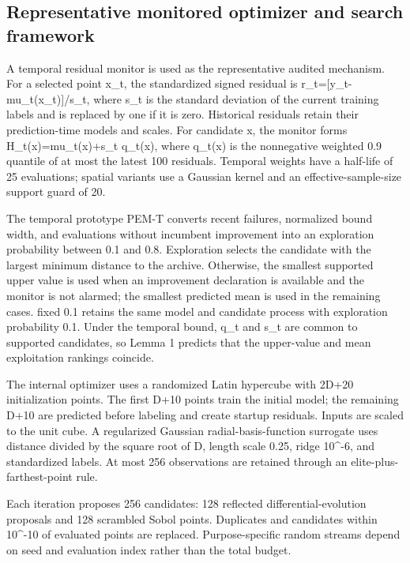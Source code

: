 \documentclass[]{interact}
\begin{document}
\hypertarget{representative-monitored-optimizer-and-search-framework}{%
\subsection{Representative monitored optimizer and search framework}\label{representative-monitored-optimizer-and-search-framework}}

A temporal residual monitor is used as the representative audited mechanism. For a selected point x\_\allowbreak t, the standardized signed residual is r\_\allowbreak t={[}y\_\allowbreak t-mu\_\allowbreak t(x\_\allowbreak t){]}/s\_\allowbreak t, where s\_\allowbreak t is the standard deviation of the current training labels and is replaced by one if it is zero. Historical residuals retain their prediction-time models and scales. For candidate x, the monitor forms H\_\allowbreak t(x)=mu\_\allowbreak t(x)+s\_\allowbreak t q\_\allowbreak t(x), where q\_\allowbreak t(x) is the nonnegative weighted 0.9 quantile of at most the latest 100 residuals. Temporal weights have a half-life of 25 evaluations; spatial variants use a Gaussian kernel and an effective-sample-size support guard of 20.

The temporal prototype PEM-T converts recent failures, normalized bound width, and evaluations without incumbent improvement into an exploration probability between 0.1 and 0.8. Exploration selects the candidate with the largest minimum distance to the archive. Otherwise, the smallest supported upper value is used when an improvement declaration is available and the monitor is not alarmed; the smallest predicted mean is used in the remaining cases. fixed 0.1 retains the same model and candidate process with exploration probability 0.1. Under the temporal bound, q\_\allowbreak t and s\_\allowbreak t are common to supported candidates, so Lemma 1 predicts that the upper-value and mean exploitation rankings coincide.

The internal optimizer uses a randomized Latin hypercube with 2D+20 initialization points. The first D+10 points train the initial model; the remaining D+10 are predicted before labeling and create startup residuals. Inputs are scaled to the unit cube. A regularized Gaussian radial-basis-function surrogate uses distance divided by the square root of D, length scale 0.25, ridge 10\^{}-6, and standardized labels. At most 256 observations are retained through an elite-plus-farthest-point rule.

Each iteration proposes 256 candidates: 128 reflected differential-evolution proposals and 128 scrambled Sobol points. Duplicates and candidates within 10\^{}-10 of evaluated points are replaced. Purpose-specific random streams depend on seed and evaluation index rather than the total budget.
\end{document}
